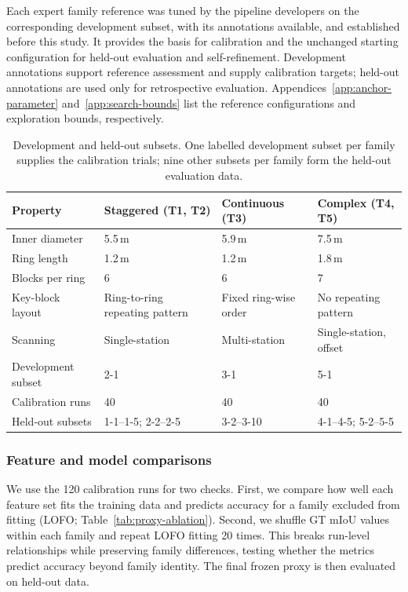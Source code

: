 \documentclass[a4paper,fleqn]{cas-dc}
\begin{document}
{Each expert family reference was tuned by the pipeline developers on the corresponding development subset, with its annotations available, and established before this study. It provides the basis for calibration and the unchanged starting configuration for held-out evaluation and self-refinement. Development annotations support reference assessment and supply calibration targets; held-out annotations are used only for retrospective evaluation. Appendices~\ref{app:anchor-parameter} and~\ref{app:search-bounds} list the reference configurations and exploration bounds, respectively.

\begin{table}[t]
\caption{Development and held-out subsets. One labelled development subset per family supplies the calibration trials; nine other subsets per family form the held-out evaluation data.}
\label{tab:dataset}
\centering
\begin{tabular}{p{} p{} p{} p{}}
\toprule
Property & Staggered (T1, T2) & Continuous (T3) & Complex (T4, T5) \\
\midrule
Inner diameter & 5.5\,m & 5.9\,m & 7.5\,m \\
Ring length & 1.2\,m & 1.2\,m & 1.8\,m \\
Blocks per ring & 6 & 6 & 7 \\
Key-block layout & Ring-to-ring repeating pattern & Fixed ring-wise order & No repeating pattern \\
Scanning & Single-station & Multi-station & Single-station, offset \\
Development subset & 2-1 & 3-1 & 5-1 \\
Calibration runs & 40 & 40 & 40 \\
Held-out subsets & 1-1--1-5; 2-2--2-5 & 3-2--3-10 & 4-1--4-5; 5-2--5-5 \\
\bottomrule
\end{tabular}
\end{table}


\subsubsection{Feature and model comparisons}
\label{sec:comparators}

We use the 120 calibration runs for two checks. First, we compare how well each feature set fits the training data and predicts accuracy for a family excluded from fitting (LOFO; Table~\ref{tab:proxy-ablation}). Second, we shuffle GT mIoU values within each family and repeat LOFO fitting 20 times. This breaks run-level relationships while preserving family differences, testing whether the metrics predict accuracy beyond family identity. The final frozen proxy is then evaluated on held-out data.

}
\end{document}
